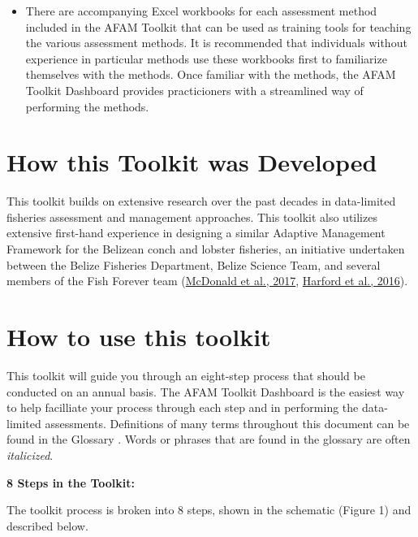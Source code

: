 \documentclass[]{book}
\providecommand{\tightlist}{%
  \setlength{\itemsep}{0pt}\setlength{\parskip}{0pt}}
\begin{document}
\begin{itemize}
\tightlist
\item
  There are accompanying Excel workbooks for each assessment method
  included in the AFAM Toolkit that can be used as training tools for
  teaching the various assessment methods. It is recommended that
  individuals without experience in particular methods use these
  workbooks first to familiarize themselves with the methods. Once
  familiar with the methods, the AFAM Toolkit Dashboard provides
  practicioners with a streamlined way of performing the methods.
\end{itemize}

\section{How this Toolkit was
Developed}\label{how-this-toolkit-was-developed}

This toolkit builds on extensive research over the past decades in
data-limited fisheries assessment and management approaches. This
toolkit also utilizes extensive first-hand experience in designing a
similar Adaptive Management Framework for the Belizean conch and lobster
fisheries, an initiative undertaken between the Belize Fisheries
Department, Belize Science Team, and several members of the Fish Forever
team (\href{http://dx.doi.org/10.1016/j.marpol.2016.11.027}{McDonald et
al., 2017}, \href{http://dx.doi.org/10.5343/bms.2016.1025}{Harford et
al., 2016}).

\section{How to use this toolkit}\label{how-to-use-this-toolkit}

This toolkit will guide you through an eight-step process that should be
conducted on an annual basis. The AFAM Toolkit Dashboard is the easiest
way to help facilliate your process through each step and in performing
the data-limited assessments. Definitions of many terms throughout this
document can be found in the Glossary . Words or phrases that are found
in the glossary are often \emph{italicized}.

\textbf{8 Steps in the Toolkit:}

The toolkit process is broken into 8 steps, shown in the schematic
(Figure 1) and described below.
\end{document}
